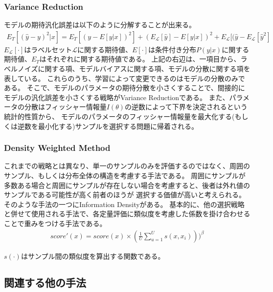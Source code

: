 \subsubsection{Variance Reduction}
モデルの期待汎化誤差は以下のように分解することが出来る。
\begin{eqnarray}
    E_T [(\hat{y} - y)^2|x] = E_T [(y - E[y|x])^2] + (E_{\mathcal{L}}[\hat{y}] - E[y|x])^2 + E_{\mathcal{L}} [(\hat{y} - E_{\mathcal{L}}[\hat{y}^2]
\end{eqnarray}
$E_{\mathcal{L}}[\cdot]$はラベルセット$\mathcal{L}$に関する期待値、$E[\cdot]$は条件付き分布$P(y|x)$に関する期待値、$E_T$はそれぞれに関する期待値である。
上記の右辺は、一項目から、ラベルノイズに関する項、モデルバイアスに関する項、モデルの分散に関する項を表している。
これらのうち、学習によって変更できるのはモデルの分散のみである。
そこで、モデルのパラメータの期待分散を小さくすることで、間接的にモデルの汎化誤差を小さくする戦略がVariance Reductionである。
また、パラメータの分散はフィッシャー情報量$I(\theta)$の逆数によって下界を決定されるという統計的性質から、
モデルのパラメータのフィッシャー情報量を最大化する(もしくは逆数を最小化する)サンプルを選択する問題に帰着される。

\subsubsection{Density Weighted Method}
これまでの戦略とは異なり、単一のサンプルのみを評価するのではなく、周囲のサンプル、もしくは分布全体の構造を考慮する手法である。
周囲にサンプルが多数ある場合と周囲にサンプルが存在しない場合を考慮すると、後者は外れ値のサンプルである可能性が高く前者のほうが
選択する価値が高いと考えられる。
そのような手法の一つにInformation Densityがある。
基本的に、他の選択戦略と併せて使用される手法で、各定量評価に類似度を考慮した係数を掛け合わせることで重みをつける手法である。
\begin{eqnarray}
    score'(x) = score(x) \times (\frac{1}{U} \sum_{u=1}^{U} s(x, x_i)))^{\beta}
\end{eqnarray}

$s(\cdot)$はサンプル間の類似度を算出する関数である。

\subsection{関連する他の手法}
